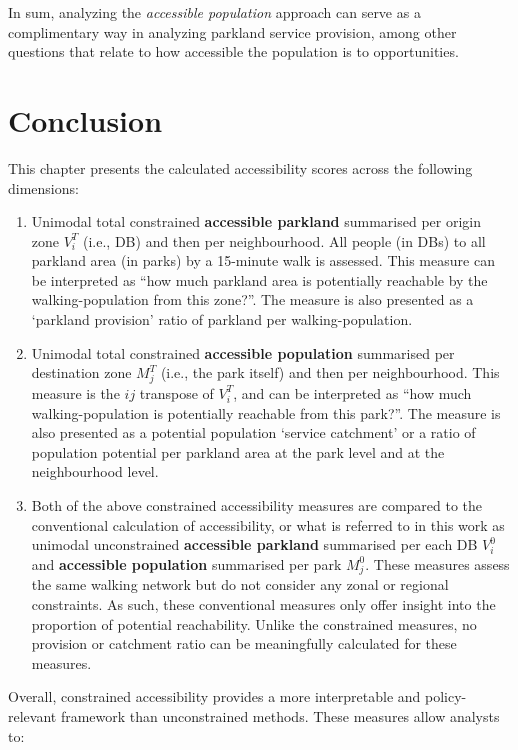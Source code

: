 \documentclass[
11pt, %
oneside, %
english, %
singlespacing, %
]{macthesis} %
\def\tightlist{}
\begin{document}
In sum, analyzing the \emph{accessible population} approach can serve as a complimentary way in analyzing parkland service provision, among other questions that relate to how accessible the population is to opportunities.

\section{Conclusion}\label{conclusion}

This chapter presents the calculated accessibility scores across the following dimensions:

\begin{enumerate}
\def\labelenumi{\arabic{enumi}.}
\tightlist
\item
  Unimodal total constrained \textbf{accessible parkland} summarised per origin zone \(V_i^T\) (i.e., DB) and then per neighbourhood. All people (in DBs) to all parkland area (in parks) by a 15-minute walk is assessed. This measure can be interpreted as ``how much parkland area is potentially reachable by the walking-population from this zone?''. The measure is also presented as a `parkland provision' ratio of parkland per walking-population.
\item
  Unimodal total constrained \textbf{accessible population} summarised per destination zone \(M_j^T\) (i.e., the park itself) and then per neighbourhood. This measure is the \(ij\) transpose of \(V_i^T\), and can be interpreted as ``how much walking-population is potentially reachable from this park?''. The measure is also presented as a potential population `service catchment' or a ratio of population potential per parkland area at the park level and at the neighbourhood level.
\item
  Both of the above constrained accessibility measures are compared to the conventional calculation of accessibility, or what is referred to in this work as unimodal unconstrained \textbf{accessible parkland} summarised per each DB \(V_i^0\) and \textbf{accessible population} summarised per park \(M_j^0\). These measures assess the same walking network but do not consider any zonal or regional constraints. As such, these conventional measures only offer insight into the proportion of potential reachability. Unlike the constrained measures, no provision or catchment ratio can be meaningfully calculated for these measures.
\end{enumerate}

Overall, constrained accessibility provides a more interpretable and policy-relevant framework than unconstrained methods. These measures allow analysts to:
\end{document}
